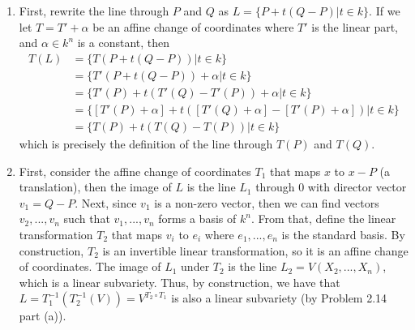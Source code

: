 \begin{solution}
    \begin{enumerate}
        \item First, rewrite the line through $P$ and $Q$ as $L = \{P + t(Q-P) | t \in k\}$. If we let $T = T' + \alpha$ be an affine change of coordinates where $T'$ is the linear part, and $\alpha \in k^n$ is a constant, then 
        \begin{align*}
            T(L) &= \{T(P + t(Q-P)) | t \in k\} \\
            &= \{T'(P + t(Q-P)) + \alpha | t \in k\} \\
            &= \{T'(P) + t(T'(Q) - T'(P)) + \alpha | t \in k\} \\
            &= \{[T'(P) + \alpha] + t([T'(Q) + \alpha] - [T'(P) + \alpha]) | t \in k\} \\
            &= \{T(P) + t(T(Q) - T(P)) | t \in k\}
        \end{align*}
        which is precisely the definition of the line through $T(P)$ and $T(Q)$.
        \item First, consider the affine change of coordinates $T_1$ that maps $x$ to $x - P$ (a translation), then the image of $L$ is the line $L_1$ through 0 with director vector $v_1 = Q-P$. Next, since $v_1$ is a non-zero vector, then we can find vectors $v_2, ..., v_n$ such that $v_1, ..., v_n$ forms a basis of $k^n$. From that, define the linear transformation $T_2$ that maps $v_i$ to $e_i$ where $e_1, ..., e_n$ is the standard basis. By construction, $T_2$ is an invertible linear transformation, so it is an affine change of coordinates. The image of $L_1$ under $T_2$ is the line $L_2 = V(X_2, ..., X_n)$, which is a linear subvariety. Thus, by construction, we have that $L = T_1^{-1}(T_2^{-1}(V)) = V^{T_2 \circ T_1}$ is also a linear subvariety (by Problem 2.14 part (a)).
        

\end{enumerate}
\end{solution}

